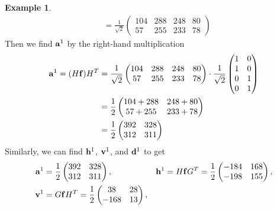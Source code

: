 \documentclass{article}
\theoremstyle{definition}
\newtheorem{example}[definition]{Example}
\begin{document}
\begin{example}
\begin{align*}
      &= \frac{1}{\sqrt{2}}
      \begin{pmatrix}
        104 & 288 & 248 & 80 \\
        57 & 255 & 233 & 78
      \end{pmatrix}
    \end{align*}
    Then we find \(\vb{a}^1\) by the right-hand multiplication
    \begin{align*} %
      \vb{a}^1 = (H \vb{f}) H^T &= \frac{1}{\sqrt{2}}
      \begin{pmatrix}
        104 & 288 & 248 & 80 \\
        57 & 255 & 233 & 78
      \end{pmatrix}
      \cdot \frac{1}{\sqrt{2}}
      \begin{pmatrix}
        1 & 0\\
        1 & 0\\
        0 & 1\\
        0 & 1
      \end{pmatrix}\\
      &= \frac{1}{2}
      \begin{pmatrix}
        104 + 288 & 248 + 80 \\
        57 + 255 & 233 + 78
      \end{pmatrix}\\
      &= \frac{1}{2}
      \begin{pmatrix}
        392 & 328\\
        312 & 311
      \end{pmatrix}
    \end{align*}
    Similarly, we can find \(\vb{h}^1\), \(\vb{v}^1\), and \(\vb{d}^1\) to get
    \begin{align*}
      \vb{a}^1 &=
      \frac{1}{2}
      \begin{pmatrix}
        392 & 328\\
        312 & 311
      \end{pmatrix},&
      \vb{h}^1 &= H\vb{f}G^T
      = \frac{1}{2}
      \begin{pmatrix}
        -184 & 168 \\
        -198 & 155
      \end{pmatrix},\\
      \vb{v}^1 &= G\vb{f}H^T
      = \frac{1}{2}
      \begin{pmatrix}
          38 & 28 \\
        -168 & 13
      \end{pmatrix},&

\end{align*}
\end{example}
\end{document}
